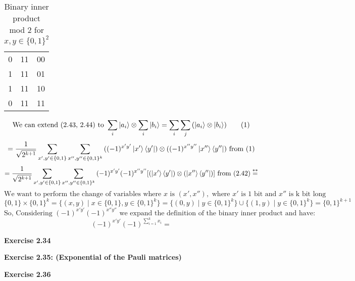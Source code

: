 \documentclass{article}
\begin{document}
\begin{framed}
\begin{table}[H]
\begin{tabular}{|c|c|c|}
        0 & 11 & 00 \\ 1 & 11 & 01 \\ 1 & 11 & 10 \\ 0 & 11 & 11 \\ 
        \hline
    \end{tabular}
    \caption{Binary inner product mod 2 for $x, y \in \{0,1\}^2$}
    \label{tab:binary_inner_product}
\end{table}
    \begin{equation}
        \text{We can extend (2.43, 2.44) to } \sum_{i}{\ket{a_i}} \otimes \sum_{i}{\ket{b_i}} = \sum_{i}\sum_{j}{(\ket{a_i} \otimes \ket{b_i})}
        \tag{1}
    \end{equation}
    $$
    = \frac{1}{\sqrt{2^{k+1}}}\sum_{x',y'\in\{0,1\}}\sum_{x'',y''\in\{0,1\}^k}{((-1)^{x'y'}\ket{x'}\bra{y'}) \otimes ((-1)^{x''y''}\ket{x''}\bra{y''})}
     \text{ from (1)}
    $$
    $$
    = \frac{1}{\sqrt{2^{k+1}}}\sum_{x',y'\in\{0,1\}}\sum_{x'',y''\in\{0,1\}^k}{(-1)^{x'y'}(-1)^{x''y''}[(\ket{x'}\bra{y'}) \otimes (\ket{x''}\bra{y''})]}
     \text{ from (2.42)} \overset{**}{=}
    $$
    $$
    \text{We want to perform the change of variables where } x \text{ is } (x', x''), \text{ where } x' \text{ is 1 bit and } x'' \text{ is k bit long}   
    $$
    $$
    \{0,1\} \times \{0,1\}^k = \{(x, y) \mid x \in \{0,1\}, y \in \{0,1\}^k\} = \{(0, y) \mid y \in \{0,1\}^k\} \cup \{(1, y) \mid y \in \{0,1\}^k\} = \{0,1\}^{k+1}
    $$
    $$
    \text{So, Considering } (-1)^{x'y'}(-1)^{x''y''} \text { we expand the definition of the binary inner product and have: } 
    $$
    $$
    (-1)^{x'y'}(-1)^{\sum_{i = 1}^{k}{x_i}} = 
    $$


\end{framed}

\bigskip

\begin{framed}
    \noindent \textbf{Exercise 2.34}
    
    \medskip
    
    
\end{framed}

\bigskip

\begin{framed}
    \noindent \textbf{Exercise 2.35: (Exponential of the Pauli matrices)}
    
    \medskip
    
    
\end{framed}

\bigskip

\begin{framed}
    \noindent \textbf{Exercise 2.36}
    
    \medskip
    
    
\end{framed}
\end{document}
